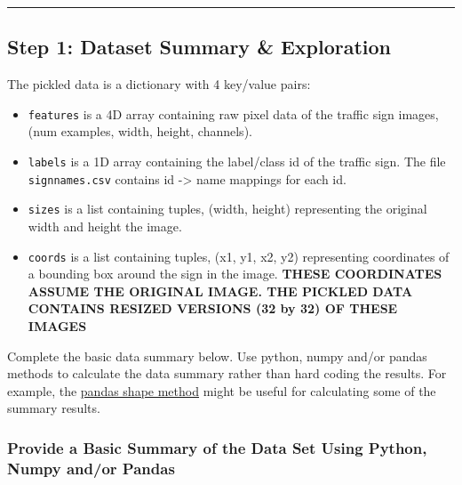 \documentclass[11pt]{article}
\providecommand{\tightlist}{%
      \setlength{\itemsep}{0pt}\setlength{\parskip}{0pt}}
\begin{document}
    \begin{center}\rule{0.5\linewidth}{\linethickness}\end{center}

\subsection{Step 1: Dataset Summary \&
Exploration}\label{step-1-dataset-summary-exploration}

The pickled data is a dictionary with 4 key/value pairs:

\begin{itemize}
\tightlist
\item
  \texttt{\textquotesingle{}features\textquotesingle{}} is a 4D array
  containing raw pixel data of the traffic sign images, (num examples,
  width, height, channels).
\item
  \texttt{\textquotesingle{}labels\textquotesingle{}} is a 1D array
  containing the label/class id of the traffic sign. The file
  \texttt{signnames.csv} contains id -\textgreater{} name mappings for
  each id.
\item
  \texttt{\textquotesingle{}sizes\textquotesingle{}} is a list
  containing tuples, (width, height) representing the original width and
  height the image.
\item
  \texttt{\textquotesingle{}coords\textquotesingle{}} is a list
  containing tuples, (x1, y1, x2, y2) representing coordinates of a
  bounding box around the sign in the image. \textbf{THESE COORDINATES
  ASSUME THE ORIGINAL IMAGE. THE PICKLED DATA CONTAINS RESIZED VERSIONS
  (32 by 32) OF THESE IMAGES}
\end{itemize}

Complete the basic data summary below. Use python, numpy and/or pandas
methods to calculate the data summary rather than hard coding the
results. For example, the
\href{http://pandas.pydata.org/pandas-docs/stable/generated/pandas.DataFrame.shape.html}{pandas
shape method} might be useful for calculating some of the summary
results.

    \subsubsection{Provide a Basic Summary of the Data Set Using Python,
Numpy and/or
Pandas}\label{provide-a-basic-summary-of-the-data-set-using-python-numpy-andor-pandas}
\end{document}
